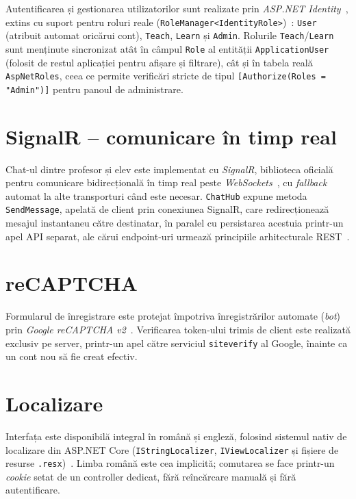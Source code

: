 Autentificarea și gestionarea utilizatorilor sunt realizate prin \emph{ASP.NET
Identity}~\cite{identity-docs}, extins cu suport pentru roluri reale
(\texttt{RoleManager<IdentityRole>})~\cite{identity-roles-docs}: \texttt{User}
(atribuit automat oricărui cont), \texttt{Teach}, \texttt{Learn} și \texttt{Admin}.
Rolurile \texttt{Teach}/\texttt{Learn} sunt menținute sincronizat atât în câmpul
\texttt{Role} al entității \texttt{ApplicationUser} (folosit de restul aplicației
pentru afișare și filtrare), cât și în tabela reală \texttt{AspNetRoles}, ceea ce
permite verificări stricte de tipul \texttt{[Authorize(Roles = "Admin")]} pentru
panoul de administrare.

\section{SignalR -- comunicare în timp real}

Chat-ul dintre profesor și elev este implementat cu \emph{SignalR}, biblioteca
oficială pentru comunicare bidirecțională în timp real peste
\emph{WebSockets}~\cite{signalr-docs, websocket-rfc}, cu \emph{fallback} automat
la alte transporturi când este necesar. \texttt{ChatHub} expune metoda
\texttt{SendMessage}, apelată de client prin conexiunea SignalR, care
redirecționează mesajul instantaneu către destinatar, în paralel cu persistarea
acestuia printr-un apel API separat, ale cărui endpoint-uri urmează principiile
arhitecturale REST~\cite{fielding-rest}.

\section{reCAPTCHA}

Formularul de înregistrare este protejat împotriva înregistrărilor automate
(\emph{bot}) prin \emph{Google reCAPTCHA v2}~\cite{recaptcha-docs}. Verificarea
token-ului trimis de client este realizată exclusiv pe server, printr-un apel
către serviciul \texttt{siteverify} al Google, înainte ca un cont nou să fie
creat efectiv.

\section{Localizare}

Interfața este disponibilă integral în română și engleză, folosind sistemul
nativ de localizare din ASP.NET Core (\texttt{IStringLocalizer},
\texttt{IViewLocalizer} și fișiere de resurse \texttt{.resx})~\cite{localization-docs}.
Limba română este cea implicită; comutarea se face printr-un \emph{cookie}
setat de un controller dedicat, fără reîncărcare manuală și fără autentificare.

